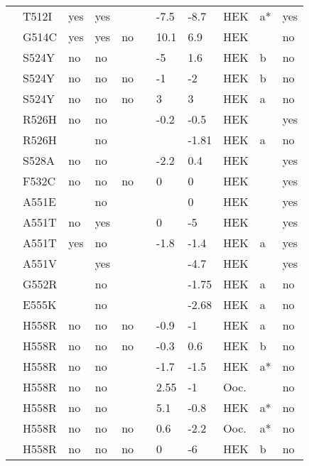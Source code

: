 \begin{tiny}
\begin{longtable}{p{4cm}|l|llll|ll|lll}
\citet{Viswanathan2003MutationDB} & T512I & yes & yes &  &  & -7.5 & -8.7 & HEK & a* & yes \\
\citet{Tan2001MutationDB} & G514C & yes & yes & no &  & 10.1 & 6.9 & HEK &  & no \\
\citet{Shuraih2007MutationDB} & S524Y & no & no &  &  & -5 & 1.6 & HEK & b & no \\
\citet{Tan2005MutationDB} & S524Y & no & no & no &  & -1 & -2 & HEK & b & no \\
\citet{Tan2005MutationDB} & S524Y & no & no & no &  & 3 & 3 & HEK & a & no \\
\citet{Aiba2014MutationDB} & R526H & no & no &  &  & -0.2 & -0.5 & HEK &  & yes \\
\citet{Hoshi2014MutationDB} & R526H &  & no &  &  &  & -1.81 & HEK & a & no \\
\citet{Aiba2014MutationDB} & S528A & no & no &  &  & -2.2 & 0.4 & HEK &  & yes \\
\citet{Otagiri2008MutationDB} & F532C & no & no & no &  & 0 & 0 & HEK &  & yes \\
\citet{Chiang2009MutationDB} & A551E &  & no &  &  &  & 0 & HEK &  & yes \\
\citet{Chiang2009MutationDB} & A551T & no & yes &  &  & 0 & -5 & HEK &  & yes \\
\citet{Juang2014aMutationDB} & A551T & yes & no &  &  & -1.8 & -1.4 & HEK & a & yes \\
\citet{Chiang2009MutationDB} & A551V &  & yes &  &  &  & -4.7 & HEK &  & yes \\
\citet{Hoshi2014MutationDB} & G552R &  & no &  &  &  & -1.75 & HEK & a & no \\
\citet{Hoshi2014MutationDB} & E555K &  & no &  &  &  & -2.68 & HEK & a & no \\
\citet{Cheng2010MutationDB} & H558R & no & no & no &  & -0.9 & -1 & HEK & a & no \\
\citet{Cheng2010MutationDB} & H558R & no & no & no &  & -0.3 & 0.6 & HEK & b & no \\
\citet{Gui2010bMutationDB} & H558R & no & no &  &  & -1.7 & -1.5 & HEK & a* & no \\
\citet{Kauferstein2013aMutationDB} & H558R & no & no &  &  & 2.55 & -1 & Ooc. &  & no \\
\citet{Murphy2012MutationDB} & H558R & no & no &  &  & 5.1 & -0.8 & HEK & a* & no \\
\citet{Surber2008MutationDB} & H558R & no & no & no &  & 0.6 & -2.2 & Ooc. & a* & no \\
\citet{Tan2005MutationDB} & H558R & no & no & no &  & 0 & -6 & HEK & b & no \\

\end{longtable}
\end{tiny}
